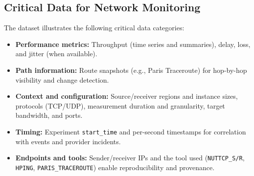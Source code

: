 \documentclass[11pt,a4paper]{article}
\begin{document}
\subsection*{Critical Data for Network Monitoring}
The dataset illustrates the following critical data categories:
\begin{itemize}[leftmargin=1.2em]
  \item \textbf{Performance metrics:} Throughput (time series and summaries), delay, loss, and jitter (when available).
  \item \textbf{Path information:} Route snapshots (e.g., Paris Traceroute) for hop-by-hop visibility and change detection.
  \item \textbf{Context and configuration:} Source/receiver regions and instance sizes, protocols (TCP/UDP), measurement duration and granularity, target bandwidth, and ports.
  \item \textbf{Timing:} Experiment \texttt{start\_time} and per-second timestamps for correlation with events and provider incidents.
  \item \textbf{Endpoints and tools:} Sender/receiver IPs and the tool used (\texttt{NUTTCP\_S/R}, \texttt{HPING}, \texttt{PARIS\_TRACEROUTE}) enable reproducibility and provenance.
\end{itemize}
\end{document}
